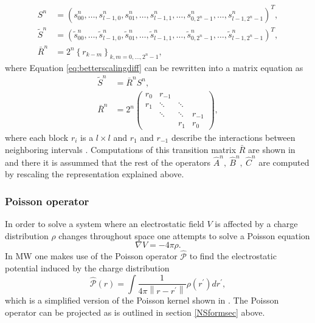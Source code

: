 \documentclass[../master_thesis.tex]{subfiles}
\begin{document}
\begin{equation}
\begin{aligned}
  S^{n} &=\left( s_{00}^{n}, \ldots, s_{l-1,0}^{n}, s_{01}^{n},
  \ldots, s_{l-1,1}^{n}, \ldots, s_{0,2^{n}-1}^{n}, \ldots, s_{l-1,2^{n}-1}^{n}
  \right)^{T}, \\
  \tilde{S}^{n} &=\left(\tilde{s}_{00}^{n}, \ldots, \tilde{s}_{l-1,0}^{n},
  \tilde{s}_{01}^{n}, \ldots, \tilde{s}_{l-1,1}^{n}, \ldots,
  \tilde{s}_{0,2^{n}-1}^{n}, \ldots, \tilde{s}_{l-1,2^{n}-1}^{n}\right)^{T},\\
  \bar{R}^{n} &=2^{n}\left\{r_{k-m}\right\}_{k, m=0, \ldots, 2^{n}-1},
\end{aligned}
\end{equation}
where Equation \ref{eq:betterscalingdiff} can be rewritten into a matrix equation
as
\begin{align}
\tilde{S}^{n}&=\bar{R}^{n} S^{n},\\
\bar{R}^{n}&=2^{n}
\begin{pmatrix}
  r_0 & r_{-1} &  &  \\
  r_1 & \ddots & \ddots & \\
   & \ddots & \ddots & r_{-1} \\
   & & r_1 & r_0
\end{pmatrix},
\end{align}
where each block $r_i$ is a $l\times l$ and $r_1$ and  $r_{-1}$ describe the interactions
between neighboring intervals \cite{Beylkin1999AdaptiveSO}.
Computations of this transition matrix $\bar{R}$ are shown in \cite{Beylkin1999AdaptiveSO}
and there it is assummed that the rest of the operators $\hat{A}^n,\ \hat{B}^n,\ \hat{C}^n$
are computed by rescaling the representation explained above.

\subsubsection{Poisson operator}
In order to solve a system where an electrostatic field $V$ is affected by a
charge distribution $\rho$ changes throughout space one attempts to solve a Poisson equation
\begin{equation}
  \nabla V = -4\pi \rho.
\end{equation}
In \ac{MW} one makes use of the Poisson operator $\hat{\mathscr{P}}$ to
find the electrostatic potential induced by the charge distribution
\begin{equation}\label{eq:Poissonopmw}
\hat{\mathscr{P}}(r)=\int \frac{1}{4 \pi\left\|r-r^{\prime}\right\|} \rho\left(r^{\prime}\right)
d r^{\prime},
\end{equation}
which is a simplified version of the Poisson kernel shown in \cite{Frediani:2013}.
The Poisson operator can be projected as is outlined in section \ref{NSformsec} above.
\end{document}

